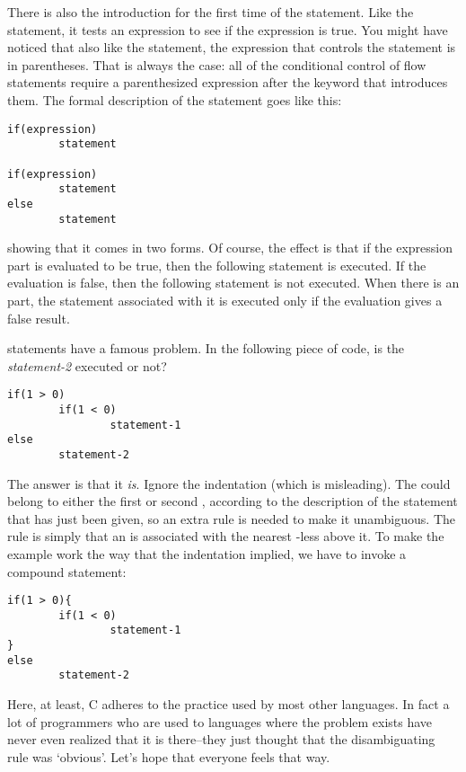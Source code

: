    There is also the introduction for the first time of the \kif{}
    statement. Like the \while{} statement, it tests an expression
    to see if the expression is true. You might have noticed that also like
    the \while{} statement, the expression that controls the
    \kif{} statement is in parentheses. That is always the case: all
    of the conditional control of flow statements require a parenthesized
    expression after the keyword that introduces them. The formal description
    of the \kif{} statement goes like this:


   \begin{Verbatim}
if(expression)
        statement

if(expression)
        statement
else
        statement
\end{Verbatim}

   showing that it comes in two forms. Of course, the effect is that if the
    expression part is evaluated to be true, then the following statement is
    executed. If the evaluation is false, then the following statement is not
    executed. When there is an \kelse{} part, the statement associated
    with it is executed only if the evaluation gives a false result.


   \kif{} statements have a famous problem. In the following piece
    of code, is the \textit{statement-2} executed or not?


   \begin{Verbatim}
if(1 > 0)
        if(1 < 0)
                statement-1
else
        statement-2
\end{Verbatim}

The answer is that it \textit{is}. Ignore the indentation (which is
misleading). The \kelse{} could belong to either the first or
second \kif, according to the description of the \kif{}
statement that has just been given, so an extra rule is needed to make it
unambiguous. The rule is simply that an \kelse{} is associated
with the nearest \kelse-less \kif{} above it. To make
the example work the way that the indentation implied, we have to invoke a
compound statement:


   \begin{Verbatim}
if(1 > 0){
        if(1 < 0)
                statement-1
}
else
        statement-2
\end{Verbatim}

   Here, at least, C adheres to the practice used by most other languages.
    In fact a lot of programmers who are used to languages where the problem
    exists have never even realized that it is there--they just thought
    that the disambiguating rule was `obvious'. Let's hope that
    everyone feels that way.


